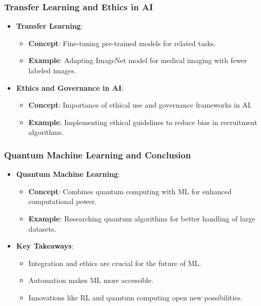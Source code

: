 \documentclass[aspectratio=169]{beamer}
\begin{document}
\begin{frame}[fragile]
    \frametitle{Transfer Learning and Ethics in AI}
    \begin{itemize}
        \item \textbf{Transfer Learning}:
            \begin{itemize}
                \item \textbf{Concept}: Fine-tuning pre-trained models for related tasks.
                \item \textbf{Example}: Adapting ImageNet model for medical imaging with fewer labeled images.
            \end{itemize}
        \item \textbf{Ethics and Governance in AI}:
            \begin{itemize}
                \item \textbf{Concept}: Importance of ethical use and governance frameworks in AI.
                \item \textbf{Example}: Implementing ethical guidelines to reduce bias in recruitment algorithms.
            \end{itemize}
    \end{itemize}
\end{frame}

\begin{frame}[fragile]
    \frametitle{Quantum Machine Learning and Conclusion}
    \begin{itemize}
        \item \textbf{Quantum Machine Learning}:
            \begin{itemize}
                \item \textbf{Concept}: Combines quantum computing with ML for enhanced computational power.
                \item \textbf{Example}: Researching quantum algorithms for better handling of large datasets.
            \end{itemize}
        \item \textbf{Key Takeaways}:
            \begin{itemize}
                \item Integration and ethics are crucial for the future of ML.
                \item Automation makes ML more accessible.
                \item Innovations like RL and quantum computing open new possibilities.
            \end{itemize}
    \end{itemize}
\end{frame}
\end{document}
